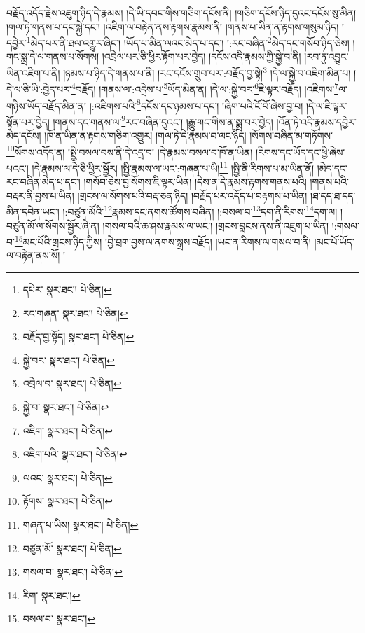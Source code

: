 བརྗོད་འདོད་རྗེས་འཇུག་ཉིད་དེ་རྣམས། །དེ་ཡི་དབང་གིས་གཅིག་དངོས་ནི། །གཅིག་དངོས་ཉིད་དུའང་དངོས་སུ་མིན། །གལ་ཏེ་གནས་པ་དང་སྐྱེ་དང་། །འཇིག་ལ་བརྟེན་ནས་རྟགས་རྣམས་ནི། །གནས་པ་ཡིན་ན་རྟགས་གསུམ་ཉིད། །དབྱེར་\footnote{དཔེར་  སྣར་ཐང་།  པེ་ཅིན། }མེད་པར་ནི་ཐལ་འགྱུར་ཞིང་། །ཡོད་པ་མིན་ལའང་མེད་པ་དང་། །:རང་བཞིན་\footnote{རང་གཞན་  སྣར་ཐང་།  པེ་ཅིན། }མེད་དང་གསོབ་ཉིད་ཅེས། །གང་སྨྲ་དེ་ལ་གནས་པ་སོགས། །འབྲེལ་པར་ཅི་ཕྱིར་རྟོག་པར་བྱེད། །དངོས་འདི་རྣམས་ཀྱི་སྐྱེ་བ་ནི། །རབ་ཏུ་འབྱུང་ཡིན་འཇིག་པ་ནི། །ཉམས་པ་ཉིད་དེ་གནས་པ་ནི། །རང་དངོས་གྲུབ་པར་:བརྗོད་བྱ་སྟེ།\footnote{བརྗོད་བྱ་སྟོད།  སྣར་ཐང་།  པེ་ཅིན། } །དེ་ལ་སྐྱེ་བ་འཇིག་མིན་པ། །དེ་ལ་ཅི་ཡི་:བྱེད་པར་\footnote{སྐྱེ་བར་  སྣར་ཐང་།  པེ་ཅིན། }བརྗོད། །གནས་ལ་:འདྲེས་པ་\footnote{འབྲེལ་བ་  སྣར་ཐང་།  པེ་ཅིན། }ཡོད་མིན་ན། །དེ་ལ་:སྐྱེ་བར་\footnote{སྐྱེ་བ་  སྣར་ཐང་།  པེ་ཅིན། }ཇི་ལྟར་བརྗོད། །འཇིགས་\footnote{འཇིག་  སྣར་ཐང་།  པེ་ཅིན། }ལ་གཉིས་ཡོད་བརྗོད་མིན་ན། །:འཇིགས་པའི་\footnote{འཇིག་པའི་  སྣར་ཐང་།  པེ་ཅིན། }དངོས་དང་ཉམས་པ་དང་། །ཞིག་པའི་ངོ་བོ་ཞེས་བྱ་བ། །དེ་ལ་ཇི་ལྟར་སྟོན་པར་བྱེད། །གནས་དང་གནས་ལ་\footnote{ལའང་  སྣར་ཐང་།  པེ་ཅིན། }རང་བཞིན་དུའང་། །རྒྱུ་གང་གིས་ན་སྨྲ་བར་བྱེད། །འོན་ཏེ་འདི་རྣམས་དབྱེར་མེད་དངོས། །ཁོ་ན་ཡིན་ན་རྟགས་གཅིག་འགྱུར། །གལ་ཏེ་དེ་རྣམས་བ་ལང་ཉིད། །སོགས་བཞིན་མ་གཏོགས་\footnote{རྟོགས་  སྣར་ཐང་།  པེ་ཅིན། }སོགས་འདོད་ན། །སྤྱི་བསལ་བས་ནི་དེ་འདྲ་བ། །དེ་རྣམས་བསལ་བ་ཁོ་ན་ཡིན། །རིགས་དང་ཡོད་དང་ཕྱི་ཞེས་པའང་། །དེ་རྣམས་ལ་དེ་ཅི་ཕྱིར་སྦྱོར། །སྤྱི་རྣམས་ལ་ཡང་:གཞན་པ་ཡི།\footnote{གཞན་པ་ཡིས།  སྣར་ཐང་།  པེ་ཅིན། } །སྤྱི་ནི་རིགས་པ་མ་ཡིན་ནོ། །མེད་དང་རང་བཞིན་མེད་པ་དང་། །གསོབ་ཅེས་བྱ་སོགས་ཇི་ལྟར་ཡིན། །དེས་ན་དེ་རྣམས་རྟགས་གནས་པའི། །གནས་པའི་བརྡར་ནི་བྱས་པ་ཡིན། །གྲངས་ལ་སོགས་པའི་བརྡ་ཅན་ཉིད། །བརྗོད་པར་འདོད་པ་བརྟགས་པ་ཡིན། །ཐ་དད་ཐ་དད་མིན་དབེན་ཡང་། །:བཙུན་མོའི་\footnote{བཙུན་མོ་  སྣར་ཐང་།  པེ་ཅིན། }རྣམས་དང་ནགས་ཚོགས་བཞིན། །:བསལ་བ་\footnote{གསལ་བ་  སྣར་ཐང་།  པེ་ཅིན། }དག་ནི་རིགས་\footnote{རིག་  སྣར་ཐང་། }དག་ལ། །བཙུན་མོ་ལ་སོགས་སྦྱོར་ཞེ་ན། །གསལ་བའི་ཆ་ཤས་རྣམས་ལ་ཡང་། །གྲངས་བླངས་ནས་ནི་འཇུག་པ་ཡིན། །:གསལ་བ་\footnote{བསལ་བ་  སྣར་ཐང་། }མང་པོའི་གྲངས་ཉིད་ཀྱིས། །བྱེ་བྲག་བྱས་ལ་ནགས་སྒྲས་བརྗོད། །ཡང་ན་རིགས་ལ་གསལ་བ་ནི། །མང་པོ་ཡོད་ལ་བརྟེན་ནས་སོ། །
